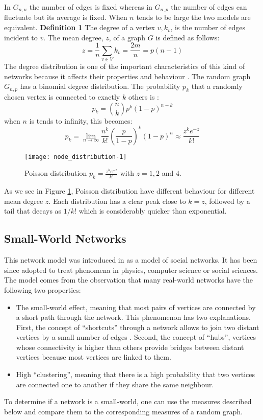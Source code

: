 In $G_{n,u}$ the number of edges is fixed whereas in $G_{n,p}$ the number of edges can fluctuate but its average is fixed. When $n$ tends to be large the two models are equivalent.
\textbf{Definition 1} The degree of a vertex $v, k_v$, is the number of edges incident to $v$. The mean degree, $z$, of a graph $G$ is defined as follows:
\[ z = \frac{1}{n} \sum_{v\in V} k_v = \frac{2m}{n} = p(n-1)\]
The degree distribution is one of the important characteristics of this kind of networks because it affects their properties and behaviour \cite{albert2000topology}. The random graph $G_{n,p}$ has a binomial degree distribution. The probability $p_k$ that a randomly chosen vertex is connected to exactly $k$ others is \cite{newman2001structure} :
\[ p_k = {n \choose k} p^k (1 - p)^{n-k} \]
when $n$ is tends to infinity, this becomes:
\[ p_k = \lim_{n \to \infty} \frac{n^k}{k!} {(\frac{p}{1-p})}^k (1-p)^n \approx \frac {z^k e^{-z}} {k!}\]

\begin{figure}[h]
\centering
\texttt{[image: node\_distribution-1]}
\caption {Poisson distribution $p_k = \frac{z^k e^{-z}}{k!}$ with $z = 1, 2 $ and $4$.}
\label {fig:node_distribution-1}
\end{figure}
As we see in Figure \ref{fig:node_distribution-1}, Poisson distribution have different behaviour for different mean degree $z$. Each distribution has a clear peak close to $k = z$, followed by a tail that decays as $1 / k!$ which is considerably quicker than exponential.
\subsection {Small-World Networks}
This network model was introduced in \cite{watts1999small} as a model of social networks. It has been since adopted to treat phenomena in physics, computer science or social sciences. The model comes from the observation that many real-world networks have the following two properties:

\begin{itemize}
\item The small-world effect, meaning that most pairs of vertices are connected by a short path through the network. This phenomenon has two explanations. First, the concept of \enquote{shortcuts} through a network allows to join two distant vertices by a small number of edges \cite{watts1999small}.
Second, the concept of \enquote{hubs}, vertices whose connectivity is higher than others provide bridges between distant vertices because most vertices are linked to them.
\item High \enquote{clustering}, meaning that there is a high probability that two vertices are connected one to another if they share the same neighbour.
\end{itemize}
To determine if a network is a small-world, one can use the measures described below and compare them to the corresponding measures of a random graph.

